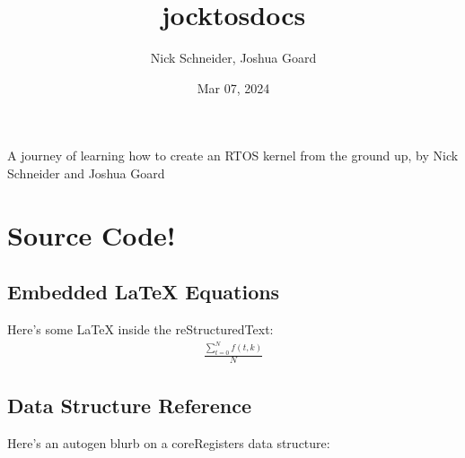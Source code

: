 \documentclass[letterpaper,10pt,english]{sphinxmanual}
\title{jocktos\sphinxhyphen{}docs}
\date{Mar 07, 2024}
\author{Nick Schneider, Joshua Goard}
\begin{document}
\pagestyle{empty}
\sphinxmaketitle
\pagestyle{plain}
\sphinxtableofcontents
\pagestyle{normal}
\label{\detokenize{index::doc}}


\sphinxAtStartPar
A journey of learning how to create an RTOS kernel from the ground up, by Nick Schneider and Joshua Goard

\sphinxstepscope


\chapter{Source Code!}
\label{\detokenize{source_code:source-code}}\label{\detokenize{source_code::doc}}

\section{Embedded LaTeX Equations}
\label{\detokenize{source_code:embedded-latex-equations}}
\sphinxAtStartPar
Here’s some LaTeX inside the reStructured\sphinxhyphen{}Text:
\begin{equation*}
\begin{split}\frac{ \sum_{t=0}^{N}f(t,k) }{N}\end{split}
\end{equation*}

\section{Data Structure Reference}
\label{\detokenize{source_code:data-structure-reference}}
\sphinxAtStartPar
Here’s an auto\sphinxhyphen{}gen blurb on a coreRegisters data structure:
\end{document}
